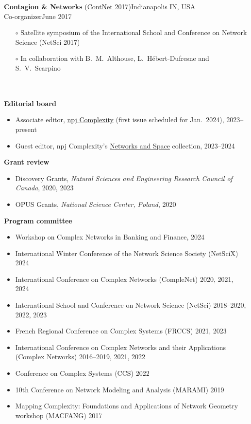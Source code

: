 \documentclass[11pt]{article}
\newcommand{\TitreSection}[1]{\colorbox{background}{\makebox[\textwidth-0.5em][c]{\Large\textrm{\textsc{#1}}}}\vspace{0.75\baselineskip}\\}
\begin{document}
%
\parbox{\textwidth}{%
\textbf{Contagion \& Networks} (\href{http://networkscontagion.github.io/contnet2017/}{ContNet 2017})\hfill Indianapolis IN, USA\\
Co-organizer\hfill June 2017
\begin{itemize}[leftmargin=1.5em]\small
  \item[$\circ$] Satellite symposium of the International School and Conference on Network Science (NetSci 2017)
  \item[$\circ$] In collaboration with B.~M.~Althouse, L.~H\'ebert-Dufresne and S.~V.~Scarpino
\end{itemize}} \vspace{0.75\baselineskip} \\
%
%
%
%
%
\TitreSection{Reviewing Activities}
%
\textbf{Editorial board}
%
\begin{itemize}\small
  \item Associate editor, \href{https://www.nature.com/npjcomplex}{npj Complexity} (first issue scheduled for Jan.~2024), 2023--present
  \item Guest editor, npj Complexity's \href{https://www.nature.com/collections/jbahhgfhii}{Networks and Space} collection, 2023--2024
\end{itemize}
%
%
%
\textbf{Grant review}
%
\begin{itemize}\small
  \item Discovery Grants, \textit{Natural Sciences and Engineering Research Council of Canada}, 2020, 2023
  \item OPUS Grants, \textit{National Science Center, Poland}, 2020
\end{itemize}
%
%
%
\textbf{Program committee}
%
\begin{itemize}\small
  \item Workshop on Complex Networks in Banking and Finance, 2024
  \item International Winter Conference of the Network Science Society (NetSciX) 2024
  \item International Conference on Complex Networks (CompleNet) 2020, 2021, 2024
  \item International School and Conference on Network Science (NetSci) 2018--2020, 2022, 2023
  \item French Regional Conference on Complex Systems (FRCCS) 2021, 2023
  \item International Conference on Complex Networks and their Applications (Complex Networks) 2016--2019, 2021, 2022
  \item Conference on Complex Systems (CCS) 2022
  \item 10th Conference on Network Modeling and Analysis (MARAMI) 2019
  \item Mapping Complexity: Foundations and Applications of Network Geometry workshop (MACFANG) 2017
\end{itemize}
\end{document}
